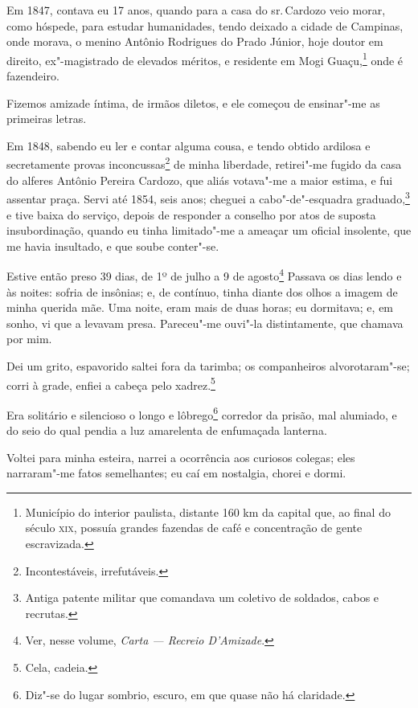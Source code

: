Em 1847, contava eu 17 anos, quando para a casa do sr.\,Cardozo veio
morar, como hóspede, para estudar humanidades, tendo deixado a cidade de
Campinas, onde morava, o menino Antônio Rodrigues do Prado Júnior, hoje
doutor em direito, ex"-magistrado de elevados méritos, e residente em
Mogi Guaçu,\footnote{Município do interior paulista, distante 160 km da
  capital que, ao final do século \textsc{xix}, possuía grandes fazendas de café
  e concentração de gente escravizada.} onde é fazendeiro.

Fizemos amizade íntima, de irmãos diletos, e ele começou de ensinar"-me
as primeiras letras.

Em 1848, sabendo eu ler e contar alguma cousa, e tendo obtido ardilosa e
secretamente provas inconcussas\footnote{Incontestáveis, irrefutáveis.}
de minha liberdade, retirei"-me fugido da casa do alferes Antônio Pereira
Cardozo, que aliás votava"-me a maior estima, e fui assentar praça. Servi
até 1854, seis anos; cheguei a cabo"-de"-esquadra graduado,\footnote{
  Antiga patente militar que comandava um coletivo de soldados, cabos e
  recrutas.} e tive baixa do serviço, depois de responder a conselho
por atos de suposta insubordinação, quando eu tinha limitado"-me a
ameaçar um oficial insolente, que me havia insultado, e que soube
conter"-se.

Estive então preso 39 dias, de 1º de julho a 9 de agosto\footnote{Ver,
  nesse volume, \emph{Carta --- Recreio D'Amizade}.} Passava os dias lendo
e às noites: sofria de insônias; e, de contínuo, tinha diante dos olhos
a imagem de minha querida mãe. Uma noite, eram mais de duas horas; eu
dormitava; e, em sonho, vi que a levavam presa. Pareceu"-me ouvi"-la
distintamente, que chamava por mim.

Dei um grito, espavorido saltei fora da tarimba; os companheiros
alvorotaram"-se; corri à grade, enfiei a cabeça pelo xadrez.\footnote{
  Cela, cadeia.}

Era solitário e silencioso o longo e lôbrego\footnote{Diz"-se do lugar
  sombrio, escuro, em que quase não há claridade.} corredor da prisão,
mal alumiado, e do seio do qual pendia a luz amarelenta de enfumaçada
lanterna.

Voltei para minha esteira, narrei a ocorrência aos curiosos colegas;
eles narraram"-me fatos semelhantes; eu caí em nostalgia, chorei e dormi.

